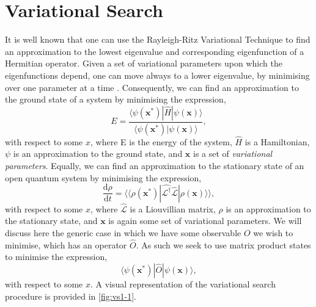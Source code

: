 \section{Variational Search}
 It is well known that one can use the Rayleigh-Ritz Variational Technique to find an approximation to the lowest eigenvalue and corresponding eigenfunction of a Hermitian operator. Given a set of variational parameters upon which the eigenfunctions depend, one can move always to a lower eigenvalue, by minimising over one parameter at a time \cite{ArfWeb_RRVT, Gasiorowicz_RVT}. Consequently, we can find an approximation to the ground state of a system by minimising the expression,
\begin{equation}
E = \frac{\langle \psi (\mathbf{x}^{*}) | \hat{H} | \psi (\mathbf{x}) \rangle}{\langle \psi (\mathbf{x}^{*}) | \psi (\mathbf{x}) \rangle},
\label{eq:vs1-1}
\end{equation}
with respect to some \(x\), where E is the energy of the system, \(\hat{H}\) is a Hamiltonian, \(\psi\) is an approximation to the ground state, and \( \mathbf{x} \) is a set of \emph{variational parameters}. Equally, we can find an approximation to the stationary state of an open quantum system by minimising the expression,
\begin{equation}
\frac{\mathrm{d}\rho}{\mathrm{d}t} = \langle \langle \rho(\mathbf{x}^{*}) | \hat{\mathcal{L}^{\dagger}} \hat{\mathcal{L}} | \rho(\mathbf{x}) \rangle \rangle,
\label{eq:vs1-2}
\end{equation}
with respect to some \(x\), where \(\hat{\mathcal{L}}\) is a Liouvillian matrix, \(\rho\) is an approximation to the stationary state, and \(\mathbf{x}\) is again some set of variational parameters. We will discuss here the generic case in which we have some observable \(O\) we wish to minimise, which has an operator \(\hat{O}\). As such we seek to use matrix product states to minimise the expression,
\begin{equation}
\langle \psi(\mathbf{x}^{*}) | \hat{O} | \psi(\mathbf{x}) \rangle,
\label{eq:vs1-10}
\end{equation}
with respect to some \(x\). A visual representation of the variational search procedure is provided in \cref{fig:vs1-1}.

